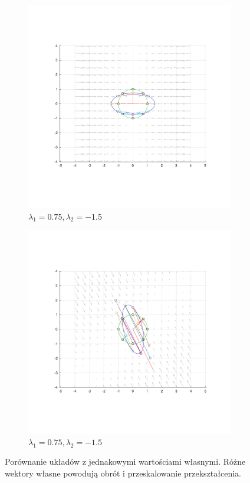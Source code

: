 \documentclass[]{article}
\begin{document}
\begin{figure}
	\centering
 	\begin{subfigure}{.5\textwidth}
		\centering
		\includegraphics[width=0.99\linewidth]{normal_075_-15}
		\caption{$\lambda_1 = 0.75, \lambda_2 = -1.5$}
		\label{fig:rotation1}
	\end{subfigure}%
	\begin{subfigure}{.5\textwidth}
		\centering
		\includegraphics[width=0.99\linewidth]{rotated_075_-15}
		\caption{$\lambda_1 = 0.75, \lambda_2 = -1.5$}
		\label{fig:rotation2}
	\end{subfigure}
	\caption{Porównanie układów z jednakowymi wartościami własnymi. Różne wektory własne powodują obrót i przeskalowanie przekształcenia.}
	\label{fig1}
\end{figure}
\end{document}

